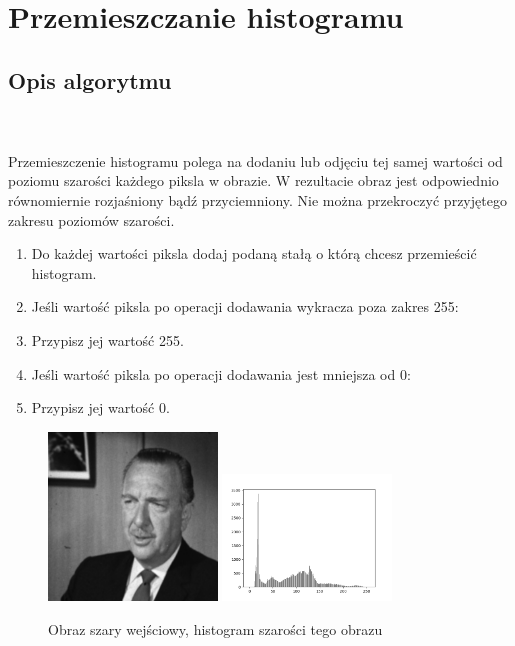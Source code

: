\documentclass[final,a4paper,openany,12pt]{mwbk}
\begin{document}
\section{Przemieszczanie histogramu}
\subsection*{Opis algorytmu}
\hfill
\\\\
\indent Przemieszczenie histogramu polega na dodaniu lub odjęciu tej samej wartości od poziomu szarości każdego piksla w obrazie.
W rezultacie obraz jest odpowiednio równomiernie rozjaśniony bądź przyciemniony.
Nie można przekroczyć przyjętego zakresu poziomów szarości.
\begin{enumerate}
	\item Do każdej wartości piksla dodaj podaną stałą o którą chcesz przemieścić histogram.
	\item Jeśli wartość piksla po operacji dodawania wykracza poza zakres 255:
	\item Przypisz jej wartość 255.
	\item Jeśli wartość piksla po operacji dodawania jest mniejsza od 0:
	\item Przypisz jej wartość 0.
\end{enumerate}

\begin{figure}[H]
	\begin{center}
		\includegraphics[width=0.4\textwidth]{gentelman_gray}
		\includegraphics[width=0.4\textwidth]{gentelman_gray_histogram}
	\end{center}
	\caption{Obraz szary wejściowy, histogram szarości tego obrazu}
\end{figure}
\end{document}
